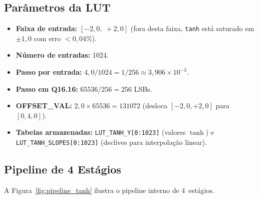 \documentclass[a4paper,12pt]{article}
\begin{document}
\subsection{Par\^ametros da LUT}

\begin{itemize}
    \item \textbf{Faixa de entrada:} $[-2{,}0,\; +2{,}0]$ (fora desta faixa, \texttt{tanh} est\'a saturado em $\pm 1{,}0$ com erro $< 0{,}04$\%).
    \item \textbf{N\'umero de entradas:} 1024.
    \item \textbf{Passo por entrada:} $4{,}0 / 1024 = 1/256 \approx 3{,}906 \times 10^{-3}$.
    \item \textbf{Passo em Q16.16:} $65536 / 256 = 256$ LSBs.
    \item \textbf{OFFSET\_VAL:} $2{,}0 \times 65536 = 131072$ (desloca $[-2{,}0, +2{,}0]$ para $[0, 4{,}0]$).
    \item \textbf{Tabelas armazenadas:} \texttt{LUT\_TANH\_Y[0:1023]} (valores $\tanh$) e \texttt{LUT\_TANH\_SLOPES[0:1023]} (declives para interpola\c{c}\~ao linear).
\end{itemize}

\subsection{Pipeline de 4 Est\'agios}

A Figura~\ref{fig:pipeline_tanh} ilustra o pipeline interno de 4~est\'agios.
\end{document}
